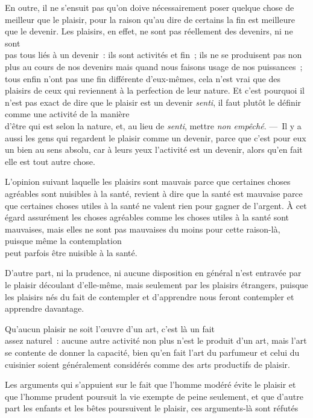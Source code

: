 \documentclass[french,twoside]{book} %
\begin{document}
En outre, il ne s’ensuit pas qu’on doive nécessairement poser quelque chose de meilleur que le plaisir, pour la raison qu’au dire de certains la fin est meilleure que le devenir. Les plaisirs, en effet, ne sont pas réellement des devenirs, ni ne sont \\
pas tous liés à un devenir : ils sont activités et fin ; ils ne se produisent pas non plus au cours de nos devenirs mais quand nous faisons usage de nos puissances ; tous enfin n’ont pas une fin différente d’eux-mêmes, cela n’est vrai que des plaisirs de ceux qui reviennent à la perfection de leur nature. Et c’est pourquoi il n’est pas exact de dire que le plaisir est un devenir {\itshape senti}, il faut plutôt le définir comme une activité de la manière \\
d’être qui est selon la nature, et, au lieu de {\itshape senti}, mettre {\itshape non empêché}. — Il y a aussi les gens qui regardent le plaisir comme un devenir, parce que c’est pour eux un bien au sens absolu, car à leurs yeux l’activité est un devenir, alors qu’en fait elle est tout autre chose.\par
L’opinion suivant laquelle les plaisirs sont mauvais parce que certaines choses agréables sont nuisibles à la santé, revient à dire que la santé est mauvaise parce que certaines choses utiles à la santé ne valent rien pour gagner de l’argent. À cet égard assurément les choses agréables comme les choses utiles à la santé sont mauvaises, mais elles ne sont pas mauvaises du moins pour cette raison-là, puisque même la contemplation \\
peut parfois être nuisible à la santé.\par
D’autre part, ni la prudence, ni aucune disposition en général n’est entravée par le plaisir découlant d’elle-même, mais seulement par les plaisirs étrangers, puisque les plaisirs nés du fait de contempler et d’apprendre nous feront contempler et apprendre davantage.\par
Qu’aucun plaisir ne soit l’œuvre d’un art, c’est là un fait \\
assez naturel : aucune autre activité non plus n’est le produit d’un art, mais l’art se contente de donner la capacité, bien qu’en fait l’art du parfumeur et celui du cuisinier soient généralement considérés comme des arts productifs de plaisir.\par
Les arguments qui s’appuient sur le fait que l’homme modéré évite le plaisir et que l’homme prudent poursuit la vie exempte de peine seulement, et que d’autre part les enfants et les bêtes poursuivent le plaisir, ces arguments-là sont réfutés \\
\end{document}
